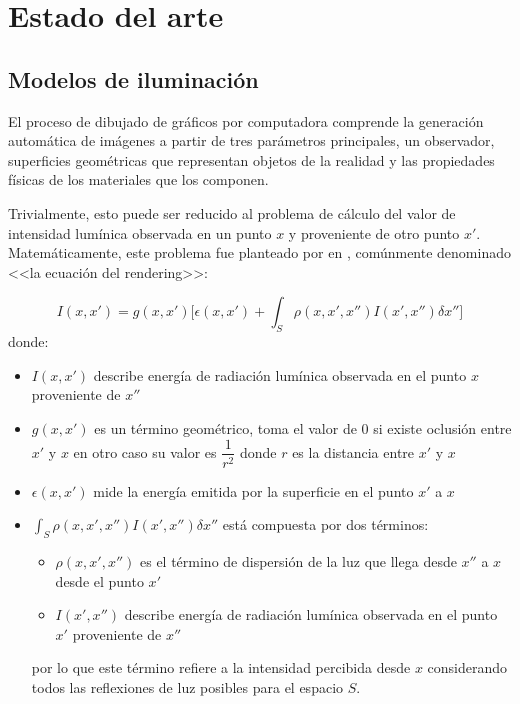 \chapter{Estado del arte}
\label{ch:chap02}

\section{Modelos de iluminación}
\label{sec:dibujado}

El proceso de dibujado de gráficos por computadora comprende la generación automática de imágenes a partir de tres parámetros principales,
un observador, superficies geométricas que representan objetos de la realidad y las propiedades físicas de los materiales que los componen.

Trivialmente, esto puede ser reducido al problema de cálculo del valor de intensidad lumínica observada en un punto $x$ y proveniente de
otro punto $x'$. Matemáticamente, este problema fue planteado por \citeauthor{Kajiya} en \citeyear{Kajiya}, comúnmente denominado <<la ecuación del rendering>>:

\begin{equation}
    I(x,x') = g(x,x') \bigg[\epsilon(x,x') + \int_{S} \rho(x,x',x'')I(x',x'') \delta x''\bigg] \label{eq:rendering}
\end{equation}
donde:
\begin{itemize}
    \item $I(x,x')$ describe energía de radiación lumínica observada en el punto $x$ proveniente de $x''$
    \item $g(x,x')$ es un término geométrico, toma el valor de $0$ si existe oclusión entre $x'$ y $x$ en otro caso su valor es $\dfrac{1}{r^{2}}$ donde $r$ es la distancia entre $x'$ y $x$
    \item $\epsilon(x,x')$ mide la energía emitida por la superficie en el punto $x'$ a $x$
    \item $\int_{S} \rho(x,x',x'')I(x',x'') \delta x''$ está compuesta por dos términos:
        \begin{itemize}
            \item $\rho(x,x',x'')$ es el término de dispersión de la luz que llega desde $x''$ a $x$ desde el punto $x'$
            \item $I(x',x'')$ describe energía de radiación lumínica observada en el punto $x'$ proveniente de $x''$
        \end{itemize}
    por lo que este término refiere a la intensidad percibida desde $x$ considerando todos las reflexiones de
    luz posibles para el espacio $S$.
\end{itemize}

